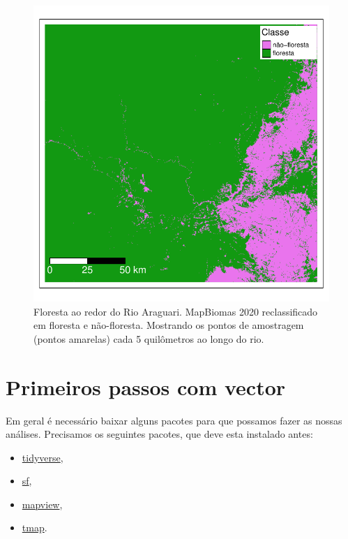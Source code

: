 \documentclass[
]{article}
\providecommand{\tightlist}{%
  \setlength{\itemsep}{0pt}\setlength{\parskip}{0pt}}
\begin{document}
\begin{figure}
\centering
\includegraphics{epr_files/figure-latex/unnamed-chunk-247-1.pdf}
\caption{\label{fig:unnamed-chunk-247}Floresta ao redor do Rio Araguari. MapBiomas 2020 reclassificado em floresta e não-floresta. Mostrando os pontos de amostragem (pontos amarelas) cada 5 quilômetros ao longo do rio.}
\end{figure}

\newpage{}

\hypertarget{primeiros-passos-com-vector}{%
\section{Primeiros passos com vector}\label{primeiros-passos-com-vector}}

Em geral é necessário baixar alguns pacotes para que possamos fazer as nossas análises. Precisamos os seguintes pacotes, que deve esta instalado antes:

\begin{itemize}
\tightlist
\item
  \href{https://www.tidyverse.org/}{tidyverse},
\item
  \href{https://r-spatial.github.io/sf/}{sf},
\item
  \href{https://r-spatial.github.io/mapview/}{mapview},
\item
  \href{https://r-tmap.github.io/tmap-book/}{tmap}.
\end{itemize}
\end{document}
